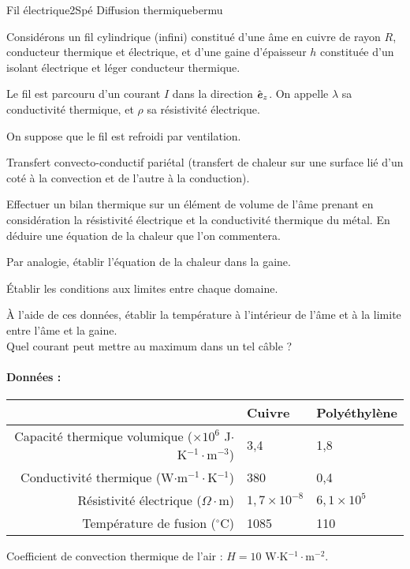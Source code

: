 \begin{exercise}{Fil électrique}{2}{Spé}
{Diffusion thermique}{bermu}

Considérons un fil cylindrique (infini) constitué d'une âme en cuivre de rayon $R$, conducteur thermique et électrique, et d'une gaine d'épaisseur $h$ constituée d'un isolant électrique et léger conducteur thermique.

Le fil est parcouru d'un courant $I$ dans la direction $\hat{\bm{\mathit{e}}}_z$. On appelle $\lambda$ sa conductivité thermique, et $\rho$ sa résistivité électrique.

On suppose que le fil est refroidi par ventilation.

\begin{questions}
    \questioncours Transfert convecto-conductif pariétal (transfert de chaleur sur une surface lié d'un coté à la convection et de l'autre à la conduction).
    
    \question Effectuer un bilan thermique sur un élément de volume de l'âme prenant en considération la résistivité électrique et la conductivité thermique du métal. En déduire une équation  de la chaleur que l'on commentera.
    
    \question Par analogie, établir l'équation de la chaleur dans la gaine.
    
    \question Établir les conditions aux limites entre chaque domaine.
    
    \question \`A l'aide de ces données, établir la température à l'intérieur de l'âme et à la limite entre l'âme et la gaine. \\
    Quel courant peut mettre au maximum dans un tel câble ?
\end{questions}

\paragraph{Données :}

\begin{center}
    \begin{tabular}{r|ll}
       &  Cuivre      & Polyéthylène  \\ \hline
    Capacité thermique volumique ($\times 10^6$ J$\cdot$K$^{-1}\cdot$m$^{-3}$) &
    3,4 & 1,8 \\
    Conductivité thermique (W$\cdot$m$^{-1}\cdot$K$^{-1}$) &
    380 & 0,4 \\
    Résistivité électrique ($\Omega\cdot$m) &
    $1,7\times 10^{-8}$ & $6,1\times 10^{5}$ \\
    Température de fusion ($^\circ$C) &
    1085 & 110 \\ \hline
    \end{tabular}
\end{center}

Coefficient de convection thermique de l'air : $H = 10$ W$\cdot$K$^{-1}\cdot$m$^{-2}$.

\end{exercise}

